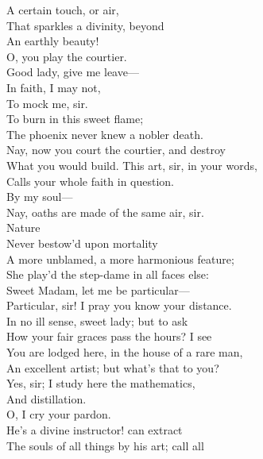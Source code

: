 \documentclass[a4paper,oneside]{memoir}
\begin{document}
\begin{drama*}
\mammonspeaks A certain touch, or air,\\
That sparkles a divinity, beyond\\
An earthly beauty!\\
\dolspeaks {} O, you play the courtier.\\
\mammonspeaks Good lady, give me leave---\\
\dolspeaks {} In faith, I may not,\\
To mock me, sir.\\
\mammonspeaks {} To burn in this sweet flame;\\
The phoenix never knew a nobler death.\\
\dolspeaks Nay, now you court the courtier, and destroy\\
What you would build. This art, sir, in your words,\\
Calls your whole faith in question.\\
\mammonspeaks {} By my soul---\\
\dolspeaks Nay, oaths are made of the same air, sir.\\
\mammonspeaks {} Nature\\
Never bestow'd upon mortality\\
A more unblamed, a more harmonious feature;\\
She play'd the step-dame in all faces else:\\
Sweet Madam, let me be particular---\\
\dolspeaks Particular, sir! I pray you know your distance.\\
\mammonspeaks In no ill sense, sweet lady; but to ask\\
How your fair graces pass the hours? I see\\
You are lodged here, in the house of a rare man,\\
An excellent artist; but what's that to you?\\
\dolspeaks Yes, sir; I study here the mathematics,\\
And distillation.\\
\mammonspeaks {} O, I cry your pardon.\\
He's a divine instructor! can extract\\
The souls of all things by his art; call all\\

\end{drama*}
\end{document}
